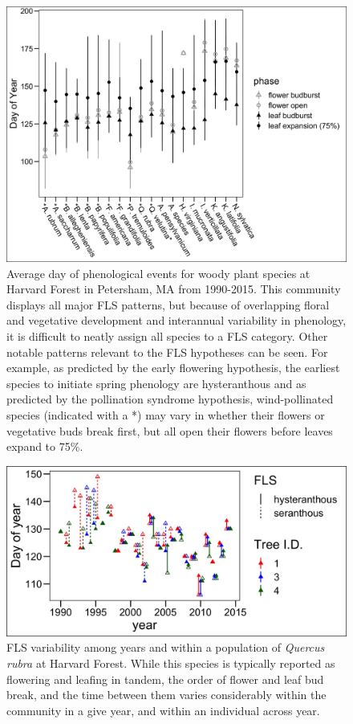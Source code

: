 \documentclass[12pt]{article}\usepackage[]{graphicx}\usepackage[]{color}
\begin{document}
\begin{figure}[ht]
    \centering
    \includegraphics[width=\textwidth]{..//figure/HFmeans_expanded.png}
    \caption{Average day of phenological events for woody plant species at Harvard Forest in Petersham, MA from 1990-2015. This community displays all major FLS patterns, but because of overlapping floral and vegetative development and interannual variability in phenology, it is difficult to neatly assign all species to a FLS category. Other notable patterns relevant to the FLS hypotheses can be seen. For example, as predicted by the early flowering hypothesis, the earliest species to initiate spring phenology are hysteranthous and as predicted by the  pollination syndrome hypothesis, wind-pollinated species (indicated with a *) may vary in whether their flowers or vegetative buds break first, but all open their flowers before leaves expand to 75\%.}
    \label{fig:Figure 2}
\end{figure}

 \begin{figure}[ht]
        \centering
          \includegraphics[width=\textwidth]{..//figure/HF_Q_ru_interannual.jpeg}
        \caption{FLS variability among years and within a population of \textit{Quercus rubra} at Harvard Forest. While this species is typically reported as flowering and leafing in tandem, the order of flower and leaf bud break, and the time between them varies considerably within the community in a give year, and within an individual across year. }
        \label{fig: Figure 3}
    \end{figure}
  
\end{document}
